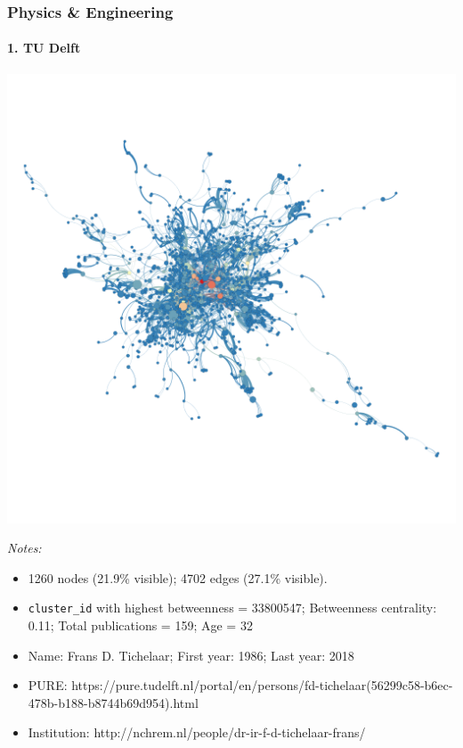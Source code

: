 \documentclass[]{elsarticle} %
\makeatletter
\providecommand{\tightlist}{%
  \setlength{\itemsep}{0pt}\setlength{\parskip}{0pt}}
\def\maxwidth{\ifdim\Gin@nat@width>\linewidth\linewidth
\else\Gin@nat@width\fi}
\let\Oldincludegraphics\includegraphics
\renewcommand{\includegraphics}[1]{\Oldincludegraphics[width=\maxwidth]{#1}}
\makeatother
\begin{document}
\hypertarget{physics-engineering}{%
\subsubsection{Physics \& Engineering}\label{physics-engineering}}

\hypertarget{tu-delft}{%
\paragraph{1. TU Delft}\label{tu-delft}}

\includegraphics{figs/tu_phys_betweenness.png}

\emph{Notes:}

\begin{itemize}
\tightlist
\item
  1260 nodes (21.9\% visible); 4702 edges (27.1\% visible).
\item
  \texttt{cluster\_id} with highest betweenness = 33800547; Betweenness
  centrality: 0.11; Total publications = 159; Age = 32
\item
  Name: Frans D. Tichelaar; First year: 1986; Last year: 2018
\item
  PURE:
  https://pure.tudelft.nl/portal/en/persons/fd-tichelaar(56299c58-b6ec-478b-b188-b8744b69d954).html
\item
  Institution: http://nchrem.nl/people/dr-ir-f-d-tichelaar-frans/
\end{itemize}
\end{document}
